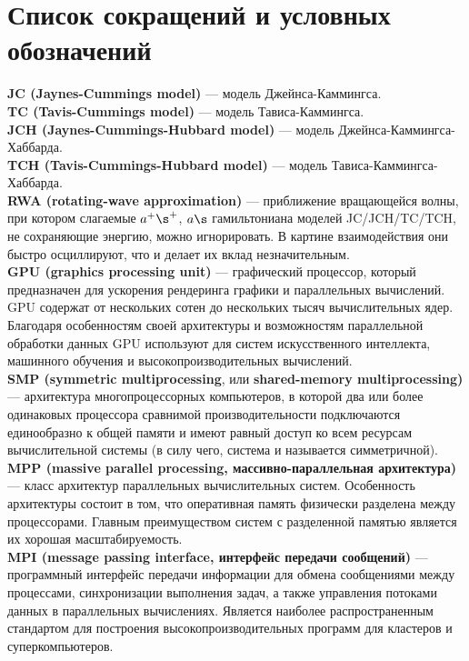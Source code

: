 \chapter*{Список сокращений и условных обозначений} %

\noindent\textbf{JC (Jaynes-Cummings model)} --- модель Джейнса-Каммингса.\\
\noindent\textbf{TC (Tavis-Cummings model)} --- модель Тависа-Каммингса.\\
\noindent\textbf{JCH (Jaynes-Cummings-Hubbard model)} --- модель Джейнса-Каммингса-Хаббарда.\\
\noindent\textbf{TCH (Tavis-Cummings-Hubbard model)} --- модель Тависа-Каммингса-Хаббарда.\\
\noindent\textbf{RWA (rotating-wave approximation)} --- приближение вращающейся волны, при котором слагаемые
$a^{+}\s^{+}$, $a\s$ гамильтониана моделей JC/JCH/TC/TCH, не сохраняющие энергию, можно игнорировать. В картине взаимодействия они быстро осциллируют, что и делает их вклад незначительным.\\
\noindent\textbf{GPU (graphics processing unit)} --- графический процессор, который предназначен для ускорения рендеринга графики и параллельных вычислений. GPU содержат от нескольких сотен до нескольких тысяч вычислительных ядер. Благодаря особенностям своей архитектуры и возможностям параллельной обработки данных GPU используют для систем искусственного интеллекта, машинного обучения и высокопроизводительных вычислений.\\
\noindent\textbf{SMP (symmetric multiprocessing}, или \textbf{shared-memory multiprocessing)} --- архитектура многопроцессорных компьютеров, в которой два или более одинаковых процессора сравнимой производительности подключаются единообразно к общей памяти и имеют равный доступ ко всем ресурсам вычислительной системы (в силу чего, система и называется симметричной).\\
\noindent\textbf{MPP (massive parallel processing, массивно-параллельная архитектура)} --- класс архитектур параллельных вычислительных систем. Особенность архитектуры состоит в том, что оперативная память физически разделена между процессорами. Главным преимуществом систем с разделенной памятью является их хорошая масштабируемость.\\
\noindent\textbf{MPI (message passing interface, интерфейс передачи сообщений)} --- программный интерфейс передачи информации для обмена сообщениями между процессами, синхронизации выполнения задач, а также управления потоками данных в параллельных вычислениях. Является наиболее распространенным стандартом для построения высокопроизводительных программ для кластеров и суперкомпьютеров.
